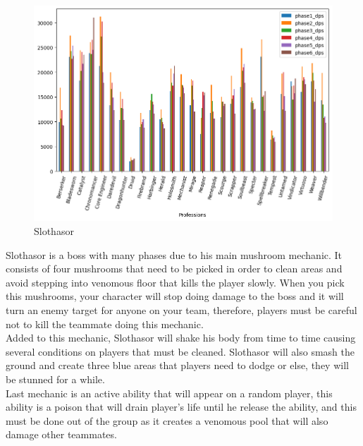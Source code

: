 \documentclass[12pt,a4paper]{article}
\begin{document}
    \begin{figure}[h!]
        
        \centering
        
        \includegraphics[width=1 \linewidth]{sloth_dps_plot.png}
        \caption{Slothasor}
    \end{figure}

    Slothasor is a boss with many phases due to his main mushroom mechanic. It consists of four mushrooms
    that need to be picked in order to clean areas and avoid stepping into venomous floor that kills the
    player slowly. When you pick this mushrooms, your character will stop doing damage to the boss and it
    will turn an enemy target for anyone on your team, therefore, players must be careful not to kill the
    teammate doing this mechanic.\\

    Added to this mechanic, Slothasor will shake his body from time to time causing several conditions on
    players that must be cleaned. Slothasor will also smash the ground and create three blue areas that 
    players need to dodge or else, they will be stunned for a while.\\

    Last mechanic is an active ability that will appear on a random player, this ability is a poison that 
    will drain player's life until he release the ability, and this must be done out of the group as it 
    creates a venomous pool that will also damage other teammates.

    \newpage
\end{document}
